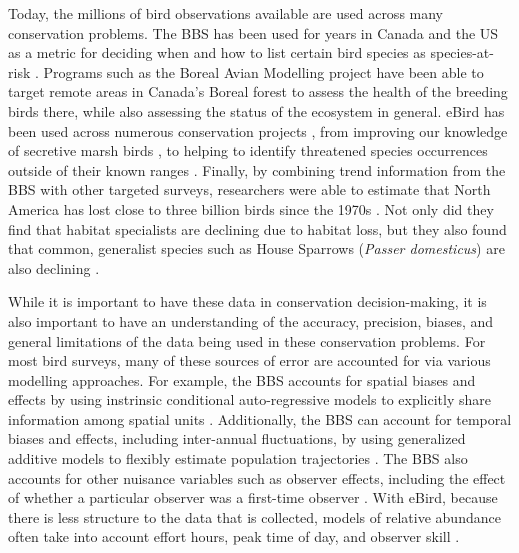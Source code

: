 \par Today, the millions of bird observations available are used across many conservation problems.
The BBS has been used for years in Canada and the US as a metric for deciding when and how to list certain bird species as species-at-risk \citep{hudson_role_2017}.
Programs such as the Boreal Avian Modelling project \citep{cumming_toward_2010, solymos_bam_2020} have been able to target remote areas in Canada's Boreal forest to assess the health of the breeding birds there, while also assessing the status of the ecosystem in general.
eBird has been used across numerous conservation projects \citep{sullivan_ebird_2009, sullivan_ebird_2014}, from improving our knowledge of secretive marsh birds \citep{bianchini_using_2023}, to helping to identify threatened species occurrences outside of their known ranges \citep{lin_using_2022}.
Finally, by combining trend information from the BBS with other targeted surveys, researchers were able to estimate that North America has lost close to three billion birds since the 1970s \citep{rosenberg_decline_2019}.
Not only did they find that habitat specialists are declining due to habitat loss, but they also found that common, generalist species such as House Sparrows (\textit{Passer domesticus}) are also declining \citep{rosenberg_decline_2019}.

\par While it is important to have these data in conservation decision-making, it is also important to have an understanding of the accuracy, precision, biases, and general limitations of the data being used in these conservation problems.
For most bird surveys, many of these sources of error are accounted for via various modelling approaches.
For example, the BBS accounts for spatial biases and effects by using instrinsic conditional auto-regressive models \citep{besag_bayesian_1991} to explicitly share information among spatial units \citep{smith_spatially_2023, smith_patterns_2023}. 
Additionally, the BBS can account for temporal biases and effects, including inter-annual fluctuations, by using generalized additive models \citep{wood_generalized_2017} to flexibly estimate population trajectories \citep{smith_north_2021}.
The BBS also accounts for other nuisance variables such as observer effects, including the effect of whether a particular observer was a first-time observer \citep{kendall_first-time_1996}.
With eBird, because there is less structure to the data that is collected, models of relative abundance often take into account effort hours, peak time of day, and observer skill \citep{johnston_estimates_2018, fink_double_2023}.


